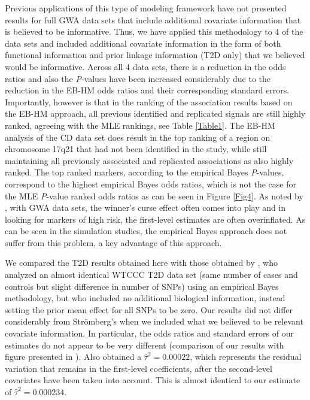 \documentclass[oupdraft]{bio}
\begin{document}
Previous applications of this type of modeling framework
have not presented results for full GWA data sets that
include additional covariate information that is believed
to be informative. Thus, we have applied this methodology
to 4 of the
\citet{Brown:1989}
data sets and included additional covariate information in
the form of both functional information and prior linkage
information (T2D only) that we believed would be informative.
Across all 4 data sets, there is a reduction in the odds
ratios and also the \textit{P}-values have been increased
considerably due to the reduction in the EB-HM odds ratios
and their corresponding standard errors. Importantly, however
is that in the ranking of the association results based on
the EB-HM approach, all previous identified and replicated
signals are still highly ranked, agreeing with the MLE
rankings, see Table \ref{Table1}. The EB-HM analysis of
the CD data set does result in the top ranking of a region on
chromosome 17q21 that had not been identified in the
\citet{SAS_Institute:1999}
study, while still maintaining all previously associated
and replicated associations as also highly ranked. The
top ranked markers, according to the empirical Bayes
\textit{P}-values, correspond to the highest empirical Bayes
odds ratios, which is not the case for the MLE
\textit{P}-value ranked odds ratios as can be seen in
Figure \ref{Fig4}. As noted by
\citet{Fimmers_Seuchter:1989},
with GWA data sets, the winner's curse effect often comes
into play and in looking for markers of high risk, the
first-level estimates are often overinflated. As can be seen
in the simulation studies, the empirical Bayes approach does
not suffer from this problem, a key advantage of this approach.

We compared the T2D results obtained here with those
obtained by
\citet{Barlow:1972},
who analyzed an almost identical WTCCC T2D data set (same
number of cases and controls but slight difference in
number of SNPs) using an empirical Bayes methodology, but who
included no additional biological information, instead setting
the prior mean effect for all SNPs to be zero. Our results did not
differ considerably from Str\"omberg's when we included what
we believed to be relevant covariate information. In particular,
the odds ratios and standard errors of our estimates do not
appear to be very different (comparison of our results with
figure presented in
\citet{Castelloe_Zimmerman:2002}).
Also
\citet{allison2006}
obtained a $\hat{\tau}^2 = 0.00022$, which represents the
residual variation that remains in the first-level coefficients,
after the second-level covariates have been taken into
account. This is almost identical to our estimate of
$\hat{\tau}^2 = 0.000234$.
\end{document}
